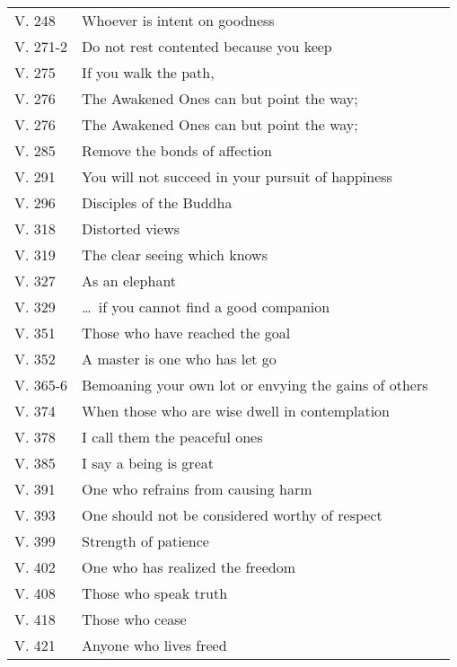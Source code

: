 {\begin{longtable}[c]{llr}
V. 248 & Whoever is intent on goodness & \pageref{dhp-248}\\
V. 271-2 & Do not rest contented because you keep & \pageref{dhp-271}\\
V. 275 & If you walk the path, & \pageref{dhp-275}\\
V. 276 & The Awakened Ones can but point the way; & \pageref{dhp-276}\\
V. 276 & The Awakened Ones can but point the way; & \pageref{dhp-276}\\
V. 285 & Remove the bonds of affection & \pageref{dhp-285}\\
V. 291 & You will not succeed in your pursuit of happiness & \pageref{dhp-291}\\
V. 296 & Disciples of the Buddha & \pageref{dhp-296}\\
V. 318 & Distorted views & \pageref{dhp-318}\\
V. 319 & The clear seeing which knows & \pageref{dhp-319}\\
V. 327 & As an elephant & \pageref{dhp-327}\\
V. 329 & \ldots\ if you cannot find a good companion & \pageref{dhp-329}\\
V. 351 & Those who have reached the goal & \pageref{dhp-351}\\
V. 352 & A master is one who has let go & \pageref{dhp-352}\\
V. 365-6 & Bemoaning your own lot or envying the gains of others & \pageref{dhp-365}\\
V. 374 & When those who are wise dwell in contemplation & \pageref{dhp-374}\\
V. 378 & I call them the peaceful ones & \pageref{dhp-378}\\
V. 385 & I say a being is great & \pageref{dhp-385}\\
V. 391 & One who refrains from causing harm & \pageref{dhp-391}\\
V. 393 & One should not be considered worthy of respect & \pageref{dhp-393}\\
V. 399 & Strength of patience & \pageref{dhp-399}\\
V. 402 & One who has realized the freedom & \pageref{dhp-402}\\
V. 408 & Those who speak truth & \pageref{dhp-408}\\
V. 418 & Those who cease & \pageref{dhp-418}\\
V. 421 & Anyone who lives freed & \pageref{dhp-421}\\
\end{longtable}

}

